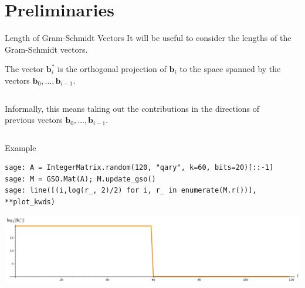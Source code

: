 \documentclass[xcolor=table,10pt,aspectratio=169]{beamer}
\renewcommand{\vec}[1]{\ensuremath{\mathbf{#1}}\xspace}
\begin{document}
\section{Preliminaries}
\label{sec:orga893c09}
\begin{frame}[label={sec:orgb52b206}]{Length of Gram-Schmidt Vectors}
It will be useful to consider the lengths of the Gram-Schmidt vectors.

The vector \(\vec{b}^*_i\) is the orthogonal projection of \(\vec{b}_i\) to the space spanned by the vectors \(\vec{b}_0, \ldots, \vec{b}_{i-1}\).

\begin{columns}
\begin{column}{0.45\columnwidth}
Informally, this means taking out the contributions in the directions of previous vectors  \(\vec{b}_0, \ldots, \vec{b}_{i-1}\).
\end{column}

\begin{column}{0.45\columnwidth}
\end{column}
\end{columns}
\end{frame}

\begin{frame}[label={sec:orgdb7796f},fragile]{Example}
 \lstset{language=sage,label= ,caption= ,captionpos=b,numbers=none}
\begin{lstlisting}
sage: A = IntegerMatrix.random(120, "qary", k=60, bits=20)[::-1]
sage: M = GSO.Mat(A); M.update_gso()
sage: line([(i,log(r_, 2)/2) for i, r_ in enumerate(M.r())], **plot_kwds)
\end{lstlisting}

\begin{center}
\includegraphics[width=.9\linewidth]{./gram-schmidt-norms.png}
\end{center}
\end{frame}
\end{document}
